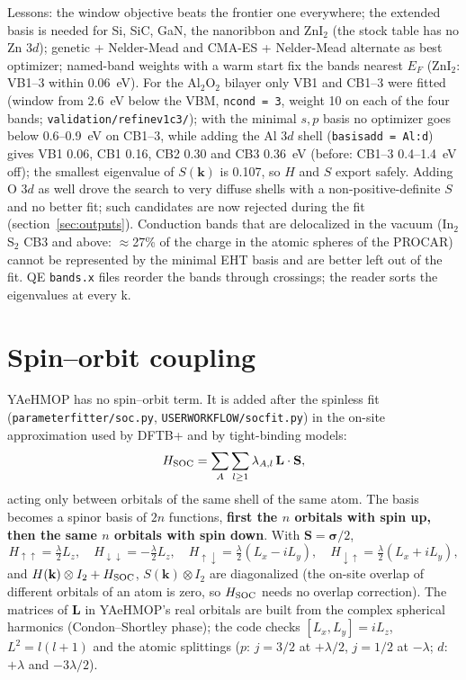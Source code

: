 \documentclass[11pt,a4paper]{article}
\newcommand{\cmd}[1]{\texttt{#1}}
\renewcommand{\_}{\origunderscore\allowbreak}
\begin{document}
Lessons: the window objective beats the frontier one everywhere; the extended basis is needed for Si, SiC, GaN, the
nanoribbon and ZnI$_2$ (the stock table has no Zn $3d$); genetic + Nelder-Mead and CMA-ES + Nelder-Mead alternate as best
optimizer; named-band weights with a warm start fix the bands nearest $E_F$ (ZnI$_2$: VB1--3 within 0.06~eV).
For the Al$_2$O$_2$ bilayer only VB1 and CB1--3 were fitted (window from 2.6~eV below the VBM, \cmd{n\_cond = 3}, weight 10
on each of the four bands; \cmd{validation/refine\_v1c3/}); with the minimal $s,p$ basis no optimizer goes below
0.6--0.9~eV on CB1--3, while adding the Al $3d$ shell (\cmd{basis\_add = Al:d}) gives VB1 0.06, CB1 0.16, CB2 0.30 and
CB3 0.36~eV (before: CB1--3 0.4--1.4~eV off); the smallest eigenvalue of $S(\mathbf k)$ is 0.107, so $H$ and $S$ export
safely. Adding O $3d$ as well drove the search to very diffuse shells with a non-positive-definite $S$ and no better fit;
such candidates are now rejected during the fit (section~\ref{sec:outputs}). Conduction bands
that are delocalized in the vacuum (In$_2$S$_2$ CB3 and above: $\approx$27\% of the charge in the atomic spheres of the PROCAR)
cannot be represented by the minimal EHT basis and are better left out of the fit. QE \cmd{bands.x} files reorder the bands
through crossings; the reader sorts the eigenvalues at every k.

\section{Spin--orbit coupling}\label{sec:soc}

YAeHMOP has no spin--orbit term. It is added after the spinless fit (\cmd{parameter\_fitter/soc.py},
\cmd{USER\_WORKFLOW/soc\_fit.py}) in the on-site approximation used by DFTB+ and by tight-binding models:
\[
H_{\rm SOC}=\sum_{A}\sum_{l\ge1}\lambda_{A,l}\,\mathbf L\cdot\mathbf S ,
\]
acting only between orbitals of the same shell of the same atom. The basis becomes a spinor basis of $2n$ functions,
\textbf{first the $n$ orbitals with spin up, then the same $n$ orbitals with spin down}. With $\mathbf S=\boldsymbol\sigma/2$,
\[
H_{\uparrow\uparrow}=\tfrac{\lambda}{2}L_z,\quad H_{\downarrow\downarrow}=-\tfrac{\lambda}{2}L_z,\quad
H_{\uparrow\downarrow}=\tfrac{\lambda}{2}(L_x-iL_y),\quad H_{\downarrow\uparrow}=\tfrac{\lambda}{2}(L_x+iL_y),
\]
and $H(\mathbf k)\otimes I_2+H_{\rm SOC}$, $S(\mathbf k)\otimes I_2$ are diagonalized (the on-site overlap of different
orbitals of an atom is zero, so $H_{\rm SOC}$ needs no overlap correction). The matrices of $\mathbf L$ in YAeHMOP's real
orbitals are built from the complex spherical harmonics (Condon--Shortley phase); the code checks
$[L_x,L_y]=iL_z$, $L^2=l(l+1)$ and the atomic splittings ($p$: $j=3/2$ at $+\lambda/2$, $j=1/2$ at $-\lambda$; $d$: $+\lambda$
and $-3\lambda/2$).
\end{document}
